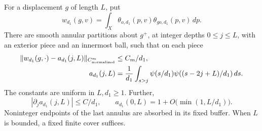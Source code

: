 \begin{lemma}\label{lem:ray-overlap}
For a displacement \(g\) of length \(L\), put
\[
 w_{d_1}(g,v)=\int_X\theta_{o,d_1}(p,v)\theta_{go,d_1}(p,v)\,dp.
\]
There are smooth annular partitions about \(g^+\), at integer depths
\(0\le j\le L\), with an exterior piece and an innermost ball,
such that on each piece
\begin{equation}\label{eq:ray-overlap-step}
 \begin{aligned}
 \|w_{d_1}(g,\cdot)-a_{d_1}(j,L)\|_{C^m_{\rm normalized}}
 &\le C_m/{d_1},\\
 a_{d_1}(j,L)&=\frac1{d_1}\int_{s>j}\psi(s/{d_1})
                  \psi((s-2j+L)/{d_1})\,ds.
 \end{aligned}
\end{equation}
The constants are uniform in \(L,{d_1}\ge1\).  Further,
\begin{equation}\label{eq:ray-overlap-increments}
 |\partial_j a_{d_1}(j,L)|\le C/{d_1},\qquad
 a_{d_1}(0,L)=1+O\bigl(\min(1,L/{d_1})\bigr).
\end{equation}
Noninteger endpoints of the last annulus are absorbed in its fixed
buffer.  When \(L\) is bounded, a fixed finite cover suffices.
\end{lemma}

